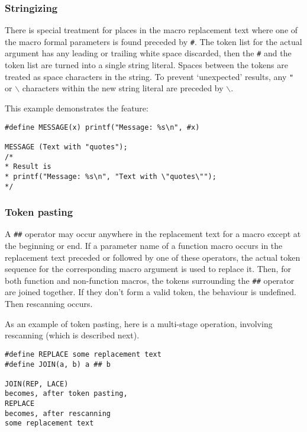    

   \subsubsection{Stringizing}
    

    There is special treatment for places in the macro replacement text
     where one of the macro formal parameters is found preceded by
     \texttt{\#}. The token list for the actual argument has any leading
     or trailing white space discarded, then the \texttt{\#} and the
     token list are turned into a single string literal. Spaces between the
     tokens are treated as space characters in the string. To prevent
     `unexpected' results, any \texttt{"}
     or \texttt{$\backslash$} characters within the new string literal are
     preceded by \texttt{$\backslash$}.


    This example demonstrates the feature:


    \begin{Verbatim}
#define MESSAGE(x) printf("Message: %s\n", #x)

MESSAGE (Text with "quotes");
/*
* Result is
* printf("Message: %s\n", "Text with \"quotes\"");
*/
\end{Verbatim}

   

   \subsubsection{Token pasting}
    

    A \texttt{\#\#} operator may occur anywhere in the replacement text
     for a macro except at the beginning or end. If a parameter name of
     a function macro occurs in the replacement text preceded or followed by
     one of these operators, the actual token sequence for the corresponding
     macro argument is used to replace it. Then, for both function and
     non-function macros, the tokens surrounding the \texttt{\#\#}
     operator are joined together. If they don't form a valid token, the
     behaviour is undefined. Then rescanning occurs.


    As an example of token pasting, here is a multi-stage operation,
     involving rescanning (which is described next).


    \begin{Verbatim}
#define REPLACE some replacement text
#define JOIN(a, b) a ## b

JOIN(REP, LACE)
becomes, after token pasting,
REPLACE
becomes, after rescanning
some replacement text
\end{Verbatim}

